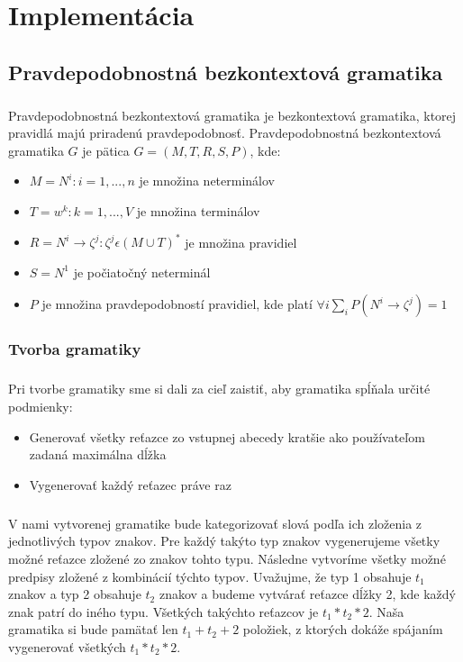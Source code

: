 \chapter{Implementácia}

\section{Pravdepodobnostná bezkontextová gramatika}
\paragraph{}
Pravdepodobnostná bezkontextová gramatika je bezkontextová gramatika, ktorej pravidlá majú priradenú pravdepodobnosť. Pravdepodobnostná bezkontextová gramatika \(G\) je pätica \(G = (M, T, R, S, P)\), kde:
\begin{itemize}
	\item \(M = { N^i : i = 1,...,n }\) je množina neterminálov
	\item \(T = { w^k : k = 1,...,V }\) je množina terminálov
	\item \(R = { N^i \to \zeta^j : \zeta^j \epsilon (M \cup T)^* }\) je množina pravidiel
	\item \(S = N^1\) je počiatočný neterminál
	\item \(P\) je množina pravdepodobností pravidiel, kde platí \( \forall i \displaystyle\sum_{i} P(N^i \to \zeta^j) = 1\)
\end{itemize}

\subsection{Tvorba gramatiky}
\paragraph{}
Pri tvorbe gramatiky sme si dali za cieľ zaistiť, aby gramatika spĺňala určité podmienky:
\begin{itemize}
	\item Generovať všetky reťazce zo vstupnej abecedy kratšie ako používateľom zadaná maximálna dĺžka
	\item Vygenerovať každý reťazec práve raz
\end{itemize}

\paragraph{}
V nami vytvorenej gramatike bude kategorizovať slová podľa ich zloženia z jednotlivých typov znakov. Pre každý takýto typ znakov vygenerujeme všetky možné reťazce zložené zo znakov tohto typu. Následne vytvoríme všetky možné predpisy zložené z kombinácií týchto typov. Uvažujme, že typ 1 obsahuje \(t_1\) znakov a typ 2 obsahuje \(t_2\) znakov a budeme vytvárať reťazce dĺžky 2, kde každý znak patrí do iného typu. Všetkých takýchto reťazcov je \(t_1 * t_2 * 2\). Naša gramatika si bude pamätať len \(t_1 + t_2 + 2\) položiek, z ktorých dokáže spájaním vygenerovať všetkých \(t_1 * t_2 * 2\).

